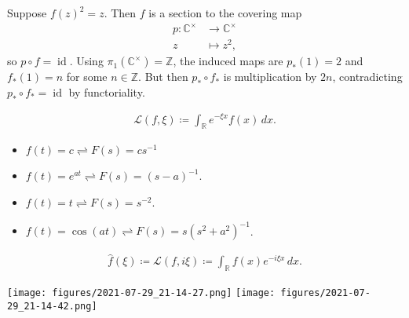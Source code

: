 \begin{solution}

Suppose \(f(z)^2 = z\). Then \(f\) is a section to the covering map
\begin{align*}
p: {\mathbb{C}}^{\times}&\to {\mathbb{C}}^{\times}\\
z & \mapsto z^2
,\end{align*}
so \(p\circ f = \operatorname{id}\). Using
\(\pi_1({\mathbb{C}}^{\times}) = {\mathbb{Z}}\), the induced maps are
\(p_*(1) = 2\) and \(f_*(1) = n\) for some \(n\in {\mathbb{Z}}\). But
then \(p_* \circ f_*\) is multiplication by \(2n\), contradicting
\(p_* \circ f_* = \operatorname{id}\) by functoriality.

\end{solution}

\begin{definition}

\begin{align*}
{\mathcal{L}}(f, \xi) \coloneqq\int_{\mathbb{R}}e^{-\xi x} f(x) \,dx
.\end{align*}

\begin{itemize}
\tightlist
\item
  \(f(t) = c \rightleftharpoons F(s) = cs^{-1}\)
\item
  \(f(t) = e^{at} \rightleftharpoons F(s) = (s-a)^{-1}\).
\item
  \(f(t) = t \rightleftharpoons F(s) = s^{-2}\).
\item
  \(f(t) = \cos(at) \rightleftharpoons F(s) = s(s^2 + a^2)^{-1}\).
\end{itemize}

\end{definition}

\begin{remark}

\begin{align*}
\widehat{f}(\xi) \coloneqq{\mathcal{L}}(f, i\xi) \coloneqq\int_{\mathbb{R}}f(x) e^{-i\xi x} \,dx
.\end{align*}

\end{remark}

\begin{fact}

\texttt{[image: figures/2021-07-29\_21-14-27.png]}
\texttt{[image: figures/2021-07-29\_21-14-42.png]}

\end{fact}


